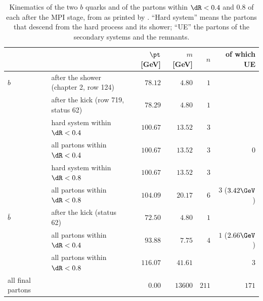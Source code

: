 \begin{table}[htbp]\centering\small
\caption[Kinematics of the two $b$ quarks and their cones after the MPI
stage]{Kinematics of the two $b$ quarks and of the partons within $\dR<0.4$
and $0.8$ of each after the MPI stage, from  as printed
by . ``Hard system'' means the
partons that descend from the hard process and its shower; ``UE'' the
partons of the secondary systems and the remnants.}
\label{tab:uninvited_cousins:kinematics}
\footnotesize
\begin{tabular}{llrrrr}\toprule
 & & $\pt$ [GeV] & $m$ [GeV] & $n$ & of which UE \\ \midrule
$b$ & after the shower (chapter 2, row 124) & $78.12$ & $4.80$ & $1$ & \\
    & after the kick (row 719, status 62) & $78.29$ & $4.80$ & $1$ & \\
    & hard system within $\dR<0.4$ & $100.67$ & $13.52$ & $3$ & \\
    & all partons within $\dR<0.4$ & $100.67$ & $13.52$ & $3$ & $0$ \\
    & hard system within $\dR<0.8$ & $100.67$ & $13.52$ & $3$ & \\
    & all partons within $\dR<0.8$ & $104.09$ & $20.17$ & $6$ & $3$ ($3.42\GeV$) \\ \midrule
$\bar b$ & after the kick (status 62) & $72.50$ & $4.80$ & $1$ & \\
    & all partons within $\dR<0.4$ & $93.88$ & $7.75$ & $4$ & $1$ ($2.66\GeV$) \\
    & all partons within $\dR<0.8$ & $116.07$ & $41.61$ & & $3$ \\ \midrule
all final partons & & $0.00$ & $13600$ & $211$ & $171$ \\
\bottomrule
\end{tabular}
\end{table}

